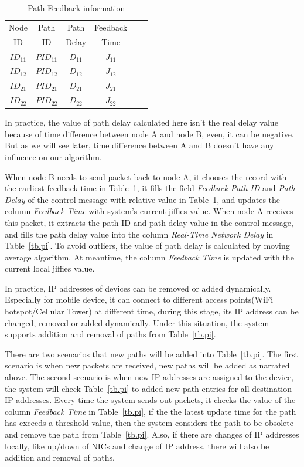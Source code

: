 \begin{table}[htbp]
\caption{\label{tb.ps}Path Feedback information}
\centering
\begin{tabular}{|c|c|c|c|c|c|}
\hline
 Node   & Path    & Path      & Feedback           \\
  ID    &  ID     & Delay     & Time               \\
\hline
${ID}_{11}$&${PID}_{11}$&${D}_{11}$&${J}_{11}$   \\
\hline
${ID}_{12}$&${PID}_{12}$&${D}_{12}$&${J}_{12}$   \\
\hline
${ID}_{21}$&${PID}_{21}$&${D}_{21}$&${J}_{21}$   \\
\hline
${ID}_{22}$&${PID}_{22}$&${D}_{22}$&${J}_{22}$   \\
\hline
\end{tabular}
\end{table}

In practice, the value of path delay calculated here isn\textquoteright t the real delay value because of time difference between node A and node B, even, it can be negative. But as we will see later, time difference between A and B doesn\textquoteright t have any influence on our algorithm.

When node B needs to send packet back to node A, it chooses the record with the earliest feedback time in Table~\ref{tb.ps}, it fills the field \emph{Feedback Path ID} and \emph{Path Delay} of the control message with relative value in Table~\ref{tb.ps}, and updates the column \emph{Feedback Time} with system\textquoteright s current jiffies value. When node A receives this packet, it extracts the path ID and path delay value in the control message, and fills the path delay value into the column \emph{Real-Time Network Delay} in Table~\ref{tb.pi}. To avoid outliers, the value of path delay is calculated by moving average algorithm. At meantime, the column \emph{Feedback Time} is updated with the current local jiffies value.

In practice, IP addresses of devices can be removed or added dynamically. Especially for mobile device, it can connect to different access points(WiFi hotspot/Cellular Tower) at different time, during this stage, its IP address can be changed, removed or added dynamically. Under this situation, the system supports addition and removal of paths from Table~\ref{tb.pi}.

There are two scenarios that new paths will be added into Table~\ref{tb.pi}. The first scenario is when new packets are received, new paths will be added as narrated above. The second scenario is when new IP addresses are assigned to the device, the system will check Table~\ref{tb.pi} to added new path entries for all destination IP addresses. Every time the system sends out packets, it checks the value of the column \emph{Feedback Time} in Table~\ref{tb.pi}, if the the latest update time for the path has exceeds a threshold value, then the system considers the path to be obsolete and remove the path from Table~\ref{tb.pi}. Also, if there are changes of IP addresses locally, like up/down of NICs and change of IP address, there will also be addition and removal of paths.

